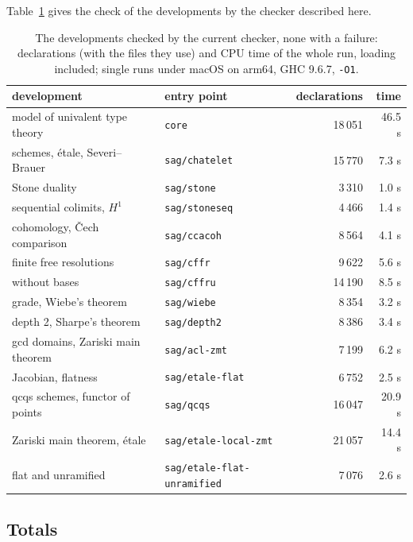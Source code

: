 \documentclass[11pt]{article}
\begin{document}
Table~\ref{tab:valid} gives the check of the developments by the
checker described here.
\begin{table}[ht]
\centering
\small
\begin{tabular}{llrr}
\toprule
development & entry point & declarations & time\\
\midrule
model of univalent type theory & \texttt{core} & 18\,051 & 46.5 s\\
schemes, \'etale, Severi--Brauer & \texttt{sag/chatelet} & 15\,770 & 7.3 s\\
Stone duality & \texttt{sag/stone} & 3\,310 & 1.0 s\\
sequential colimits, $H^1$ & \texttt{sag/stoneseq} & 4\,466 & 1.4 s\\
cohomology, \v{C}ech comparison & \texttt{sag/ccacoh} & 8\,564 & 4.1 s\\
finite free resolutions & \texttt{sag/cffr} & 9\,622 & 5.6 s\\
\quad without bases & \texttt{sag/cffru} & 14\,190 & 8.5 s\\
grade, Wiebe's theorem & \texttt{sag/wiebe} & 8\,354 & 3.2 s\\
depth 2, Sharpe's theorem & \texttt{sag/depth2} & 8\,386 & 3.4 s\\
gcd domains, Zariski main theorem & \texttt{sag/acl-zmt} & 7\,199 & 6.2 s\\
Jacobian, flatness & \texttt{sag/etale-flat} & 6\,752 & 2.5 s\\
qcqs schemes, functor of points & \texttt{sag/qcqs} & 16\,047 & 20.9 s\\
Zariski main theorem, \'etale & \texttt{sag/etale-local-zmt} & 21\,057 & 14.4 s\\
flat and unramified & \texttt{sag/etale-flat-unramified} & 7\,076 & 2.6 s\\
\bottomrule
\end{tabular}
\caption{The developments checked by the current checker, none with a
  failure: declarations (with the files they use) and CPU time of the
  whole run, loading included; single runs under macOS on arm64, GHC 9.6.7,
  \texttt{-O1}.}
\label{tab:valid}
\end{table}

\subsection{Totals}
\end{document}
